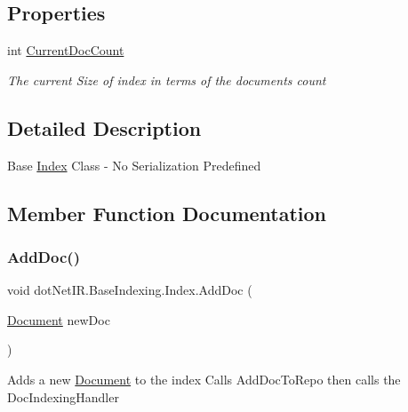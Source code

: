 \subsection*{Properties}
\begin{DoxyCompactItemize}
\item 
int \hyperlink{classdot_net_i_r_1_1_base_indexing_1_1_index_ac114b35f0475c33f94d8dad4b3942343}{Current\+Doc\+Count}
\begin{DoxyCompactList}\small\item\em The current Size of index in terms of the documents count \end{DoxyCompactList}\end{DoxyCompactItemize}


\subsection{Detailed Description}
Base \hyperlink{classdot_net_i_r_1_1_base_indexing_1_1_index}{Index} Class -\/ No Serialization Predefined 



\subsection{Member Function Documentation}
\hypertarget{classdot_net_i_r_1_1_base_indexing_1_1_index_a4e96cd46ae19e5946767c0c1eb67b992}{}\label{classdot_net_i_r_1_1_base_indexing_1_1_index_a4e96cd46ae19e5946767c0c1eb67b992} 
\subsubsection{\texorpdfstring{Add\+Doc()}{AddDoc()}}
{\footnotesize\ttfamily void dot\+Net\+I\+R.\+Base\+Indexing.\+Index.\+Add\+Doc (\begin{DoxyParamCaption}\item[{\hyperlink{classdot_net_i_r_1_1_base_indexing_1_1_document}{Document}}]{new\+Doc }\end{DoxyParamCaption})}



Adds a new \hyperlink{classdot_net_i_r_1_1_base_indexing_1_1_document}{Document} to the index Calls Add\+Doc\+To\+Repo then calls the Doc\+Indexing\+Handler 


